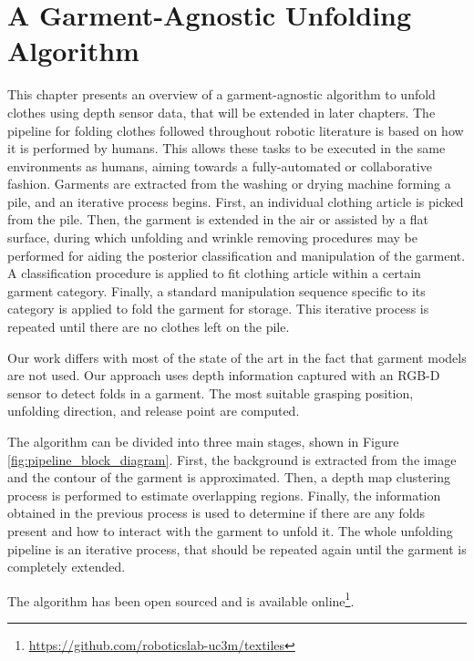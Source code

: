 \chapter{A Garment-Agnostic Unfolding Algorithm}
\label{architecture}

This chapter presents an overview of a garment-agnostic algorithm to unfold clothes using depth sensor data, that will be extended in later chapters. The pipeline for folding clothes followed throughout robotic literature is based on how it is performed by humans. This allows these tasks to be executed in the same environments as humans, aiming towards a fully-automated or collaborative fashion. Garments are extracted from the washing or drying machine forming a pile, and an iterative process begins. First, an individual clothing article is picked from the pile. Then, the garment is extended in the air or assisted by a flat surface, during which unfolding and wrinkle removing procedures may be performed for aiding the posterior classification and manipulation of the garment. A classification procedure is applied to fit clothing article within a certain garment category. Finally, a standard manipulation sequence specific to its category is applied to fold the garment for storage. This iterative process is repeated until there are no clothes left on the pile.

Our work differs with most of the state of the art in the fact that garment models are not used. Our approach uses depth information captured with an RGB-D sensor to detect folds in a garment. The most suitable grasping position, unfolding direction, and release point are computed.

The algorithm can be divided into three main stages, shown in Figure \ref{fig:pipeline_block_diagram}. First, the  background is extracted from the image and the contour of the garment is approximated. Then, a depth map clustering process is performed to estimate overlapping regions. Finally, the information obtained in the previous process is used to determine if there are any folds present and how to interact with the garment to unfold it. The whole unfolding pipeline is an iterative process, that should be repeated again until the garment is completely extended.

The algorithm has been open sourced and is available online\footnote{\url{https://github.com/roboticslab-uc3m/textiles}}.

